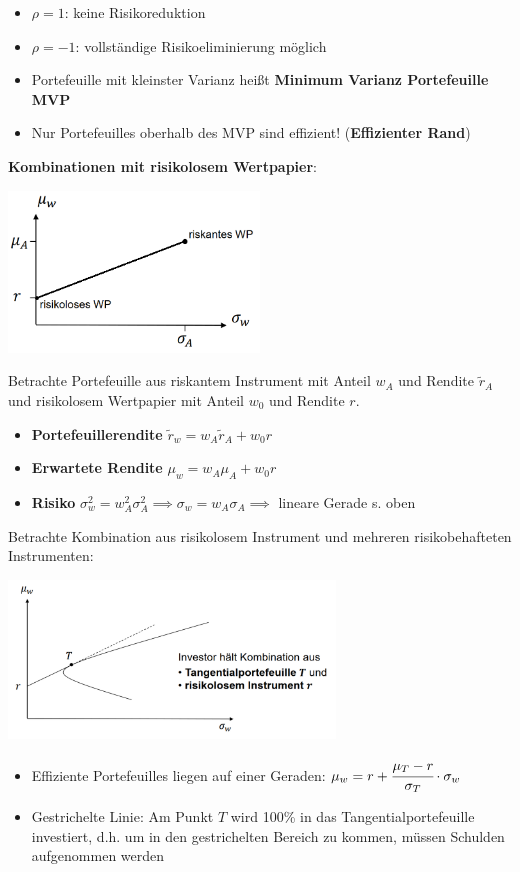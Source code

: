 \begin{itemize}
	\item $\rho=1$: keine Risikoreduktion
	\item $\rho=-1$: vollständige Risikoeliminierung möglich
	\item Portefeuille mit kleinster Varianz heißt \textbf{Minimum Varianz Portefeuille MVP}
	\item Nur Portefeuilles oberhalb des MVP sind effizient! (\textbf{Effizienter Rand})
\end{itemize}
\bigskip
\textbf{Kombinationen mit risikolosem Wertpapier}:
\begin{center}
	\includegraphics[width=0.5\textwidth]{images/riskfree.png}
\end{center}
Betrachte Portefeuille aus riskantem Instrument mit Anteil $w_A$ und Rendite $\tilde{r}_A$ und risikolosem Wertpapier mit Anteil $w_0$ und Rendite $r$.
\begin{itemize}
	\item \textbf{Portefeuillerendite} $\tilde{r}_w=w_A\tilde{r}_A+w_0r$
	\item \textbf{Erwartete Rendite} $\mu_w=w_A\mu_A+w_0r$
	\item \textbf{Risiko} $\sigma_w^2=w_A^2\sigma_A^2\implies\sigma_w=w_A\sigma_A\implies$ lineare Gerade s. oben
\end{itemize}
Betrachte Kombination aus risikolosem Instrument und mehreren risikobehafteten Instrumenten:
\begin{center}
	\includegraphics[width=0.65\textwidth]{images/r_and_r.png}
\end{center}
\begin{itemize}
	\item Effiziente Portefeuilles liegen auf einer Geraden: $\mu_w=r+\cfrac{\mu_T-r}{\sigma_T}\cdot\sigma_w$
	\item Gestrichelte Linie: Am Punkt $T$ wird 100\% in das Tangentialportefeuille investiert, d.h. um in den gestrichelten Bereich zu kommen, müssen Schulden aufgenommen werden
\end{itemize}